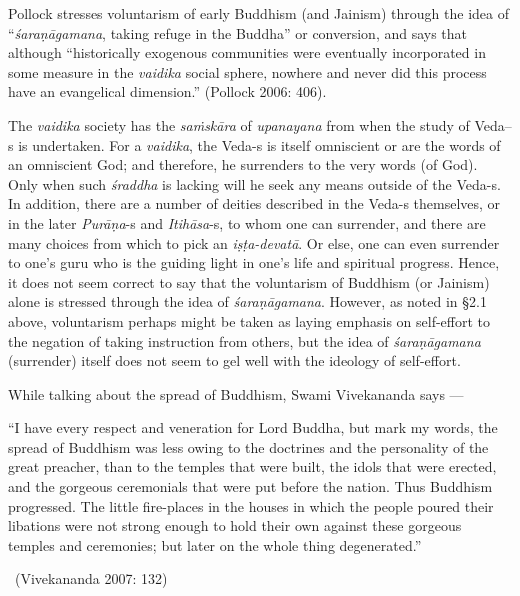 Pollock stresses voluntarism of early Buddhism (and Jainism) through the idea of “\textit{śaraṇāgamana}, taking refuge in the Buddha” or conversion, and says that although “historically exogenous communities were eventually incorporated in some measure in the \textit{vaidika} social sphere, nowhere and never did this process have an evangelical dimension.” (Pollock 2006: 406).

The \textit{vaidika} society has the \textit{saṁskāra} of \textit{upanayana} from when the study of Veda--s is undertaken. For a \textit{vaidika}, the Veda-s is itself omniscient or are the words of an omniscient God; and therefore, he surrenders to the very words (of God). Only when such \textit{śraddha} is lacking will he seek any means outside of the Veda-s. In addition, there are a number of deities described in the Veda-s themselves, or in the later \textit{Purāṇa}-s and \textit{Itihāsa}-s, to whom one can surrender, and there are many choices from which to pick an \textit{iṣṭa-devatā}. Or else, one can even surrender to one’s guru who is the guiding light in one’s life and spiritual progress. Hence, it does not seem correct to say that the voluntarism of Buddhism (or Jainism) alone is stressed through the idea of \textit{śaraṇāgamana}. However, as noted in §2.1 above, voluntarism perhaps might be taken as laying emphasis on self-effort to the negation of taking instruction from others, but the idea of \textit{śaraṇāgamana} (surrender) itself does not seem to gel well with the ideology of self-effort.

While talking about the spread of Buddhism, Swami Vivekananda says —

\begin{myquote}
“I have every respect and veneration for Lord Buddha, but mark my words, the spread of Buddhism was less owing to the doctrines and the personality of the great preacher, than to the temples that were built, the idols that were erected, and the gorgeous ceremonials that were put before the nation. Thus Buddhism progressed. The little fire-places in the houses in which the people poured their libations were not strong enough to hold their own against these gorgeous temples and ceremonies; but later on the whole thing degenerated.” 

~\hfill (Vivekananda 2007: 132)
\end{myquote}

